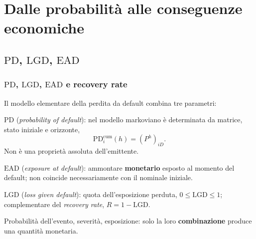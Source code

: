 

\section{Dalle probabilit\`{a} alle conseguenze economiche}

\subsection{\texorpdfstring{$\mathrm{PD}$, $\mathrm{LGD}$, $\mathrm{EAD}$}{PD, LGD, EAD}}%


%

\begin{frame}%
%

\frametitle{$\mathrm{PD}$, $\mathrm{LGD}$, $\mathrm{EAD}$ e recovery rate}%
%

%


Il modello elementare della perdita da default combina tre parametri:

\medskip

\begin{stepitemize}
\item $\mathrm{PD}$ (\emph{probability of default}): nel modello markoviano
\`{e} determinata da matrice, stato iniziale e orizzonte,
\[
\mathrm{PD}_{i}^{\mathrm{cum}}(h)=(P^{h})_{iD}.
\]
Non \`{e} una propriet\`{a} assoluta dell'emittente.

\item $\mathrm{EAD}$ (\emph{exposure at default}): ammontare
\textbf{monetario} esposto al momento del default; non coincide
necessariamente con il nominale iniziale.

\item $\mathrm{LGD}$ (\emph{loss given default}): quota dell'esposizione
perduta, $0\leq\mathrm{LGD}\leq1$; complementare del \emph{recovery rate},
$R=1-\mathrm{LGD}$.
\end{stepitemize}

\medskip

\begin{center}
{\small Probabilit\`{a} dell'evento, severit\`{a}, esposizione: solo la loro
\textbf{combinazione} produce una quantit\`{a} monetaria.}
\end{center}

%

\transboxout
\end{frame}%


